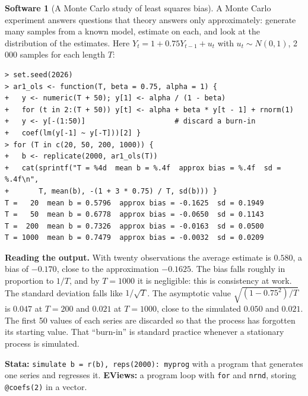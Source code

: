 \documentclass[11pt,a4paper]{article}
\numberwithin{equation}{section}
\theoremstyle{definition}
\newtheorem{software}[thm]{Software}
\begin{document}
\begin{software}[A Monte Carlo study of least squares bias]
\label{sw:arbias}
A Monte Carlo experiment answers questions that theory answers only approximately: generate many samples from a known model, estimate on
each, and look at the distribution of the estimates. Here $Y_t = 1 + 0.75Y_{t-1} + u_t$ with $u_t \sim N(0, 1)$, 2\,000 samples for each length
$T$:
{\small\begin{verbatim}
> set.seed(2026)
> ar1_ols <- function(T, beta = 0.75, alpha = 1) {
+   y <- numeric(T + 50); y[1] <- alpha / (1 - beta)
+   for (t in 2:(T + 50)) y[t] <- alpha + beta * y[t - 1] + rnorm(1)
+   y <- y[-(1:50)]                     # discard a burn-in
+   coef(lm(y[-1] ~ y[-T]))[2] }
> for (T in c(20, 50, 200, 1000)) {
+   b <- replicate(2000, ar1_ols(T))
+   cat(sprintf("T = %4d  mean b = %.4f  approx bias = %.4f  sd = %.4f\n",
+       T, mean(b), -(1 + 3 * 0.75) / T, sd(b))) }
T =   20  mean b = 0.5796  approx bias = -0.1625  sd = 0.1949
T =   50  mean b = 0.6778  approx bias = -0.0650  sd = 0.1143
T =  200  mean b = 0.7326  approx bias = -0.0163  sd = 0.0500
T = 1000  mean b = 0.7479  approx bias = -0.0032  sd = 0.0209
\end{verbatim}}
\textbf{Reading the output.} With twenty observations the average estimate is $0.580$, a bias of $-0.170$, close to the approximation $-0.1625$. The
bias falls roughly in proportion to $1/T$, and by $T = 1000$ it is negligible: this is consistency at work. The standard deviation falls like
$1/\sqrt T$. The asymptotic value $\sqrt{(1 - 0.75^2)/T}$ is $0.047$ at $T = 200$ and $0.021$ at $T = 1000$, close to the simulated $0.050$ and $0.021$.
The first 50 values of each series are discarded so that the process has forgotten its starting value. That ``burn-in'' is standard practice
whenever a stationary process is simulated.

\textbf{Stata:} \texttt{simulate b = r(b), reps(2000): myprog} with a program that generates one series and regresses it. \textbf{EViews:} a program
loop with \texttt{for} and \texttt{nrnd}, storing \texttt{@coefs(2)} in a vector.
\end{software}
\end{document}
